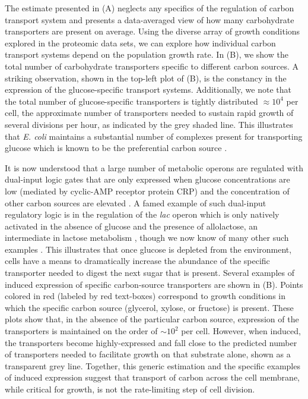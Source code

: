 The estimate presented in (A) neglects any specifics of the
regulation of carbon transport system and presents a data-averaged view of how
many carbohydrate transporters are present on average. Using the diverse array
of growth conditions explored in the proteomic data sets, we can explore how
individual carbon transport systems depend on the population growth rate. In
(B), we show the total number of carbohydrate transporters
specific to different carbon sources. A striking observation, shown in the
top-left plot of (B), is the constancy in the expression of the
glucose-specific transport systems. Additionally, we note that the total number
of glucose-specific transporters is tightly distributed $\approx 10^4$ per cell,
the approximate number of transporters needed to sustain rapid growth of several
divisions per hour, as indicated by the grey shaded line. This
illustrates that \textit{E. coli} maintains a substantial number of complexes
present for transporting glucose which is known to be the preferential carbon
source \citep{monod1947, liu2005a, aidelberg2014}.

It is now understood that a large number of metabolic operons are regulated
with dual-input logic gates that are only expressed when glucose
concentrations are low (mediated by cyclic-AMP receptor protein CRP) and the
concentration of other carbon sources are elevated \citep{gama-castro2016, zhang2014a}. A
famed example of such dual-input regulatory logic is in the regulation of the
\textit{lac} operon which is only natively activated in the absence of glucose and the
presence of allolactose, an intermediate in lactose metabolism \citep{jacob1961}, though
we now know of many other such examples \citep{ireland2020, gama-castro2016,
belliveau2018}. This illustrates that once glucose is depleted from the
environment, cells have a means to dramatically increase the abundance of the
specific transporter needed to digest the next sugar that is present. Several
examples of induced expression of specific carbon-source transporters are
shown in (B). Points colored in red (labeled by red
text-boxes) correspond to growth conditions in which the specific carbon source
(glycerol, xylose, or fructose) is present. These plots show that, in the
absence of the particular carbon source, expression of the transporters is
maintained on the order of $\sim 10^2$ per cell. However, when induced, the
transporters become highly-expressed and fall close to the predicted number of
transporters needed to facilitate growth on that substrate alone, shown as a
transparent grey line. Together, this generic estimation and the specific
examples of induced expression suggest that transport of carbon across the cell
membrane, while critical for growth, is not the rate-limiting step of cell division.


